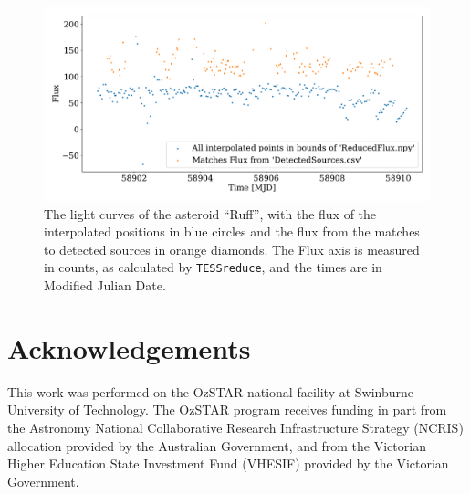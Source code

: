 \documentclass[12pt]{article}
\begin{document}
\begin{figure}
  \centering
  \includegraphics[width =\columnwidth]{../Test Code/Testing Figures/differentFluxes Ruff .pdf}
  \caption[Light curves of Ruff]{The light curves of the asteroid ``Ruff'', with the flux of the interpolated positions in blue circles and the flux from the matches to detected sources in orange diamonds.
    The Flux axis is measured in counts, as calculated by \texttt{TESSreduce}, and the times are in Modified Julian Date.}
  \label{Fig:DifFlux}
\end{figure}


\newpage %

\section*{Acknowledgements}
\small
This work was performed on the OzSTAR national facility at Swinburne University of Technology.
The OzSTAR program receives funding in part from the Astronomy National Collaborative Research Infrastructure Strategy (NCRIS) allocation provided by the Australian Government, and from the Victorian Higher Education State Investment Fund (VHESIF) provided by the Victorian Government.




\end{document}
